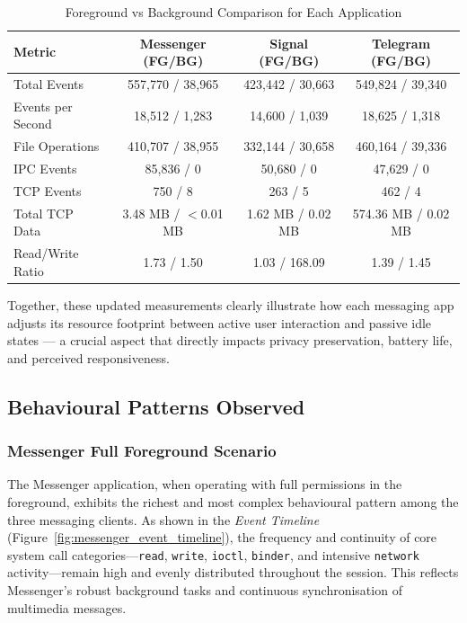 \documentclass[a4paper,12pt]{report}
\begin{document}
\begin{table}[H]
    \centering
    \caption{Foreground vs Background Comparison for Each Application}
    \label{tab:comparison_fg_vs_bg}
    \begin{tabular}{|l|c|c|c|}
        \hline
        \textbf{Metric} & \textbf{Messenger (FG/BG)} & \textbf{Signal (FG/BG)} & \textbf{Telegram (FG/BG)} \\
        \hline
        Total Events & 557,770 / 38,965 & 423,442 / 30,663 & 549,824 / 39,340 \\
        Events per Second & 18,512 / 1,283 & 14,600 / 1,039 & 18,625 / 1,318 \\
        File Operations & 410,707 / 38,955 & 332,144 / 30,658 & 460,164 / 39,336 \\
        IPC Events & 85,836 / 0 & 50,680 / 0 & 47,629 / 0 \\
        TCP Events & 750 / 8 & 263 / 5 & 462 / 4 \\
        Total TCP Data & 3.48 MB / $<$0.01 MB & 1.62 MB / 0.02 MB & 574.36 MB / 0.02 MB \\
        Read/Write Ratio & 1.73 / 1.50 & 1.03 / 168.09 & 1.39 / 1.45 \\
        \hline
    \end{tabular}
\end{table}

Together, these updated measurements clearly illustrate how each messaging app adjusts its resource footprint between active user interaction and passive idle states — a crucial aspect that directly impacts privacy preservation, battery life, and perceived responsiveness.

\subsection{Behavioural Patterns Observed}



\subsubsection{Messenger Full Foreground Scenario}

The Messenger application, when operating with full permissions in the foreground, exhibits the richest and most complex behavioural pattern among the three messaging clients. As shown in the \textit{Event Timeline} (Figure~\ref{fig:messenger_event_timeline}), the frequency and continuity of core system call categories—\texttt{read}, \texttt{write}, \texttt{ioctl}, \texttt{binder}, and intensive \texttt{network} activity—remain high and evenly distributed throughout the session. This reflects Messenger’s robust background tasks and continuous synchronisation of multimedia messages.
\end{document}
